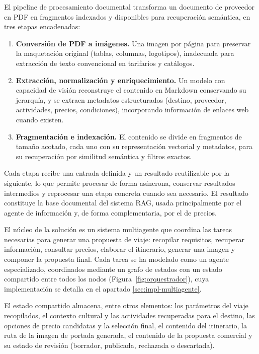 El pipeline de procesamiento documental transforma un documento de proveedor en PDF en fragmentos indexados y disponibles para recuperación semántica, en tres etapas encadenadas:

\begin{enumerate}
    \item \textbf{Conversión de PDF a imágenes.} Una imagen por página para preservar la maquetación original (tablas, columnas, logotipos), inadecuada para extracción de texto convencional en tarifarios y catálogos.
    \item \textbf{Extracción, normalización y enriquecimiento.} Un modelo con capacidad de visión reconstruye el contenido en Markdown conservando su jerarquía, y se extraen metadatos estructurados (destino, proveedor, actividades, precios, condiciones), incorporando información de enlaces web cuando existen.
    \item \textbf{Fragmentación e indexación.} El contenido se divide en fragmentos de tamaño acotado, cada uno con su representación vectorial y metadatos, para su recuperación por similitud semántica y filtros exactos.
\end{enumerate}

Cada etapa recibe una entrada definida y un resultado reutilizable por la siguiente, lo que permite procesar de forma asíncrona, conservar resultados intermedios y reprocesar una etapa concreta cuando sea necesario. El resultado constituye la base documental del sistema RAG, usada principalmente por el agente de información y, de forma complementaria, por el de precios.

El núcleo de la solución es un sistema multiagente que coordina las tareas necesarias para generar una propuesta de viaje: recopilar requisitos, recuperar información, consultar precios, elaborar el itinerario, generar una imagen y componer la propuesta final. Cada tarea se ha modelado como un agente especializado, coordinados mediante un grafo de estados con un estado compartido entre todos los nodos (Figura~\ref{fig:orquestrador}), cuya implementación se detalla en el apartado \ref{sec:impl-multiagente}.

El estado compartido almacena, entre otros elementos: los parámetros del viaje recopilados, el contexto cultural y las actividades recuperadas para el destino, las opciones de precio candidatas y la selección final, el contenido del itinerario, la ruta de la imagen de portada generada, el contenido de la propuesta comercial y su estado de revisión (borrador, publicada, rechazada o descartada).

